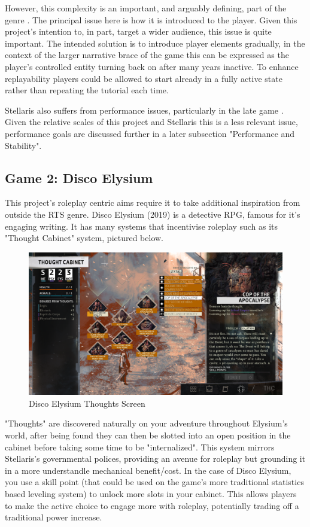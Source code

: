 \documentclass{report}
\begin{document}
However, this complexity is an important, and arguably defining, part of the genre \cite{rtsUncertainty}. The principal issue here is how it is introduced to the player. Given this project's intention to, in part, target a wider audience, this issue is quite important. The intended solution is to introduce player elements gradually, in the context of the larger narrative brace of the game this can be expressed as the player's controlled entity turning back on after many years inactive. To enhance replayability players could be allowed to start already in a fully active state rather than repeating the tutorial each time.

Stellaris also suffers from performance issues, particularly in the late game \cite{stellarisPerformanceReview1} \cite{stellarisPerformanceReview2}. Given the relative scales of this project and Stellaris this is a less relevant issue, performance goals are discussed further in a later subsection "Performance and Stability".
\pagebreak
\subsection{Game 2: Disco Elysium}

This project's roleplay centric aims require it to take additional inspiration from outside the RTS genre. Disco Elysium (2019) is a detective RPG, famous for it's engaging writing. It has many systems that incentivise roleplay such as its "Thought Cabinet" system, pictured below.

\begin{figure}[H]
    \includegraphics[width=\textwidth]{disco_elysium_thoughts_screen.png}
    \caption{Disco Elysium Thoughts Screen}
\end{figure}

"Thoughts" are discovered naturally on your adventure throughout Elysium's world, after being found they can then be slotted into an open position in the cabinet before taking some time to be "internalized". This system mirrors Stellaris's governmental polices, providing an avenue for roleplay but grounding it in a more understandle mechanical benefit/cost. In the case of Disco Elysium, you use a skill point (that could be used on the game's more traditional statistics based leveling system) to unlock more slots in your cabinet. This allows players to make the active choice to engage more with roleplay, potentially trading off a traditional power increase.
\end{document}
